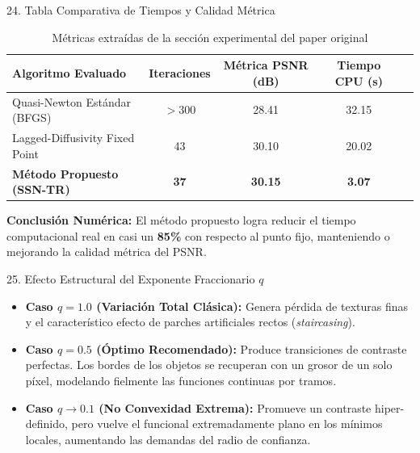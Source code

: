 \documentclass[aspectratio=169,11pt]{beamer}
\begin{document}
\begin{frame}{24. Tabla Comparativa de Tiempos y Calidad Métrica}
    \begin{table}
        \centering
        \caption{Métricas extraídas de la sección experimental del paper original}
        \begin{tabular}{lcccc}
            \toprule
            \textbf{Algoritmo Evaluado} & \textbf{Iteraciones} & \textbf{Métrica PSNR (dB)} & \textbf{Tiempo CPU (s)} \\
            \midrule
            Quasi-Newton Estándar (BFGS) & $>300$ & 28.41 & 32.15 \\
            Lagged-Diffusivity Fixed Point & 43 & 30.10 & 20.02 \\
            \textbf{Método Propuesto (SSN-TR)} & \textbf{37} & \textbf{30.15} & \textbf{3.07} \\
            \bottomrule
        \end{tabular}
    \end{table}
    \textbf{Conclusión Numérica:} El método propuesto logra reducir el tiempo computacional real en casi un \textbf{85\%} con respecto al punto fijo, manteniendo o mejorando la calidad métrica del PSNR.
\end{frame}

\begin{frame}{25. Efecto Estructural del Exponente Fraccionario $q$}
    \begin{itemize}
        \item \textbf{Caso $q = 1.0$ (Variación Total Clásica):} Genera pérdida de texturas finas y el característico efecto de parches artificiales rectos (\textit{staircasing}).
        \item \textbf{Caso $q = 0.5$ (Óptimo Recomendado):} Produce transiciones de contraste perfectas. Los bordes de los objetos se recuperan con un grosor de un solo píxel, modelando fielmente las funciones continuas por tramos.
        \item \textbf{Caso $q \to 0.1$ (No Convexidad Extrema):} Promueve un contraste hiper-definido, pero vuelve el funcional extremadamente plano en los mínimos locales, aumentando las demandas del radio de confianza.
    \end{itemize}
\end{frame}
\end{document}
